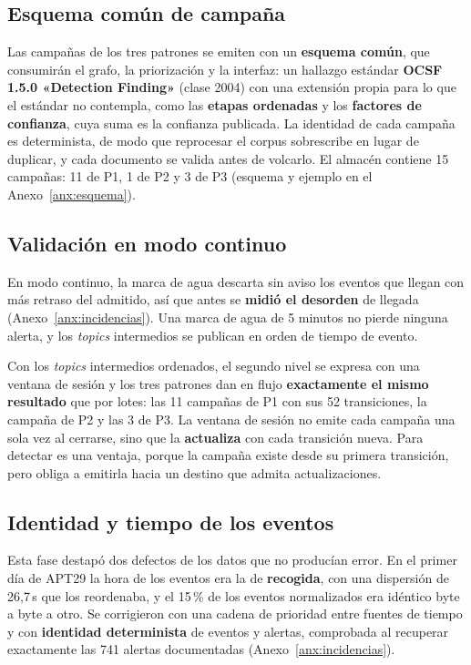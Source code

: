 \subsection{Esquema común de campaña}

Las campañas de los tres patrones se emiten con un \textbf{esquema común}, que consumirán el
grafo, la priorización y la interfaz: un hallazgo estándar \textbf{OCSF 1.5.0 «Detection Finding»}
(clase 2004) con una extensión propia para lo que el estándar no contempla, como las
\textbf{etapas ordenadas} y los \textbf{factores de confianza}, cuya suma es la confianza publicada.
La identidad de cada campaña es determinista, de modo que reprocesar el corpus sobrescribe en lugar
de duplicar, y cada documento se valida antes de volcarlo. El almacén contiene 15 campañas: 11 de
P1, 1 de P2 y 3 de P3 (esquema y ejemplo en el Anexo~\ref{anx:esquema}).

\subsection{Validación en modo continuo}
\label{sec:pilarA-streaming}

En modo continuo, la marca de agua descarta sin aviso los eventos que llegan con más retraso
del admitido, así que antes se \textbf{midió el desorden} de llegada (Anexo~\ref{anx:incidencias}).
Una marca de agua de 5 minutos no pierde ninguna alerta, y los \textit{topics} intermedios se
publican en orden de tiempo de evento.

Con los \textit{topics} intermedios ordenados, el segundo nivel se expresa con una ventana de
sesión y los tres patrones dan en flujo \textbf{exactamente el mismo resultado} que por lotes:
las 11 campañas de P1 con sus 52 transiciones, la campaña de P2 y las 3 de P3. La ventana de
sesión no emite cada campaña una sola vez al cerrarse, sino que la \textbf{actualiza} con cada
transición nueva. Para detectar es una ventaja, porque la campaña existe desde su primera
transición, pero obliga a emitirla hacia un destino que admita actualizaciones.

\subsection{Identidad y tiempo de los eventos}

Esta fase destapó dos defectos de los datos que no producían error. En el primer día de APT29
la hora de los eventos era la de \textbf{recogida}, con una dispersión de 26,7\,s que los
reordenaba, y el 15\,\% de los eventos normalizados era idéntico byte a byte a otro. Se
corrigieron con una cadena de prioridad entre fuentes de tiempo y con \textbf{identidad
determinista} de eventos y alertas, comprobada al recuperar exactamente las 741 alertas
documentadas (Anexo~\ref{anx:incidencias}).

